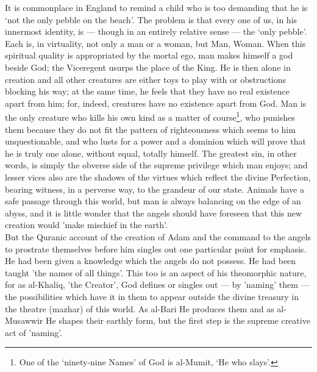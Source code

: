 \documentclass[10pt, twoside,openright]{book}
\begin{document}
It is commonplace in England to remind a child who is too demanding that he is `not the only pebble 
on the beach'. The problem is that every one of us, in his innermost identity, is --- though in an 
entirely relative sense --- the `only pebble'. Each is, in virtuality, not only a man or a woman, but 
Man, Woman. When this spiritual quality is appropriated by the mortal ego, man makes himself a god 
beside God; the Viceregent usurps the place of the King. He is then alone in creation and all other 
creatures are either toys to play with or obstructions blocking his way; at the same time, he feels 
that they have no real existence apart from him; for, indeed, creatures have no existence apart from 
God. Man is the only creature who kills his own kind as a matter of course\footnote{One of the `ninety\hyp{}nine Names' of God is al\hyp{}Mumit, `He who slays'.}, who punishes them 
because they do not fit the pattern of righteousness which seems to him unquestionable, and who lusts 
for a power and a dominion which will prove that he is truly one alone, without equal, totally 
himself. The greatest sin, in other words, is simply the obverse side of the supreme privilege which 
man enjoys; and lesser vices also are the shadows of the virtues which reflect the divine Perfection, 
bearing witness, in a perverse way, to the grandeur of our state. Animals have a safe passage through 
this world, but man is always balancing on the edge of an abyss, and it is little wonder that the 
angels should have foreseen that this new creation would 'make mischief in the earth'. \\

But the Quranic account of the creation of Adam and the command to the angels to prostrate themselves 
before him singles out one particular point for emphasis. He had been given a knowledge which the 
angels do not possess. He had been taught 'the names of all things'. This too is an aspect of his 
theomorphic nature, for as al\hyp{}Khaliq, 'the Creator', God defines or singles out --- by 'naming' them --- 
the possibilities which have it in them to appear outside the divine treasury in the theatre (mazhar) 
of this world. As al\hyp{}Bari He produces them and as al\hyp{}Musawwir He shapes their earthly form, but the 
first step is the supreme creative act of 'naming'. \\
\end{document}
